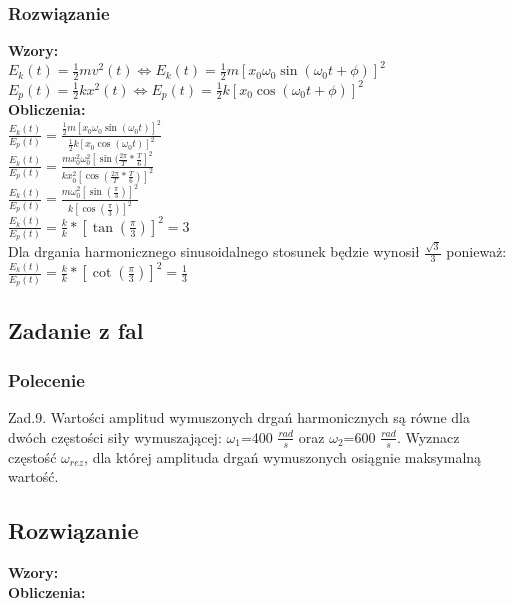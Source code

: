 \documentclass[a4paper,14pt]{extarticle}  %
\begin{document}
            \subsubsection{Rozwiązanie}
                \textbf{Wzory:}\\
                $E_k(t)=\frac{1}{2}mv^2(t)\Leftrightarrow E_k(t)=\frac{1}{2}m[x_0\omega _0\sin(\omega_0t+\phi)]^2$\\
                $E_p(t)=\frac{1}{2}kx^2(t)\Leftrightarrow E_p(t)=\frac{1}{2}k[x_0\cos(\omega_0t+\phi)]^2$\\
                \textbf{Obliczenia:}\\
                $\frac{E_k(t)}{E_p(t)}=\frac{\frac{1}{2}m[x_0\omega _0\sin(\omega_0t)]^2}{\frac{1}{2}k[x_0\cos(\omega_0t)]^2}$\\
                $\frac{E_k(t)}{E_p(t)}=\frac{mx_0^2\omega_0^2[\sin(\frac{2\pi}{T}*\frac{T}{6}]^2}{kx_0^2[\cos(\frac{2\pi}{T}*\frac{T}{6})]^2}$\\
                $\frac{E_k(t)}{E_p(t)}=\frac{m\omega _0^2[\sin(\frac{\pi}{3})]^2}{k[\cos(\frac{\pi}{3})]^2}$\\
                $\frac{E_k(t)}{E_p(t)}=\frac{k}{k}*[\tan(\frac{\pi}{3})]^2 = 3$\\
                Dla drgania harmonicznego sinusoidalnego stosunek będzie wynosił $\frac{\sqrt{3}}{3}$ ponieważ:\\
                $\frac{E_k(t)}{E_p(t)}=\frac{k}{k}*[\cot(\frac{\pi}{3})]^2 = \frac{1}{3}$\\
                \clearpage
        \subsection{Zadanie z fal}
            \subsubsection{Polecenie}
                Zad.9. Wartości amplitud wymuszonych drgań harmonicznych są równe dla dwóch częstości siły wymuszającej: 
                $\omega_1$=400 $\frac{rad}{s}$ oraz $\omega_2$=600 $\frac{rad}{s}$. 
                Wyznacz częstość $\omega_{rez}$, dla której amplituda drgań wymuszonych osiągnie maksymalną wartość.
            \subsection{Rozwiązanie}
                \textbf{Wzory:}\\
                
                \textbf{Obliczenia:}\\
\end{document}
